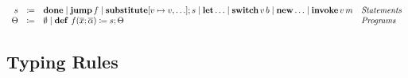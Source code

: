 
\begin{definition}
    \[ 
      \begin{array}{r c l l}
        s & \coloneqq & \mathbf{done}  \mid \mathbf{jump}\, f \mid \mathbf{substitute}[v \mapsto v,\ldots];s \mid \mathbf{let}\ldots \mid \mathbf{switch}\, v\, b \mid \mathbf{new}\ldots \mid \mathbf{invoke}\, v\, m & \emph{Statements}\\
        \Theta & \coloneqq & \emptyset \mid \mathbf{def}\ f(\overline{x};\overline{\alpha}) \coloneq s; \Theta & \emph{Programs}\\
      \end{array}
    \]
\end{definition}

\subsection{Typing Rules}
\label{subsec:axcut:typing-rules}

